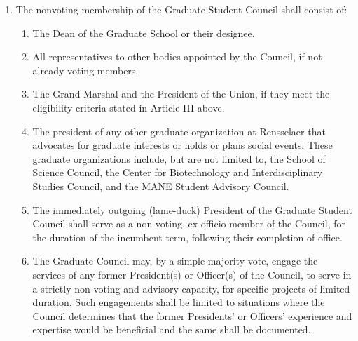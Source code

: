 \begin{enumerate}
\begin{enumerate}
  \end{enumerate}
\item The nonvoting membership of the Graduate Student Council shall consist of:
  \begin{enumerate}
  \item The Dean of the Graduate School or their designee.
  \item All representatives to other bodies appointed by the Council, if not already voting members.
  \item The Grand Marshal and the President of the Union, if they meet the eligibility criteria stated in Article III above.
  \item The president of any other graduate organization at Rensselaer that advocates for graduate interests or holds or plans social events. These graduate organizations include, but are not limited to, the School of Science Council, the Center for Biotechnology and Interdisciplinary Studies Council, and the MANE Student Advisory Council.
  \item The immediately outgoing (lame-duck) President of the Graduate Student Council shall serve as a non-voting, ex-officio member of the Council, for the duration of the incumbent term, following their completion of office.
  \item The Graduate Council may, by a simple majority vote, engage the services of any former President(s) or Officer(s) of the Council, to serve in a strictly non-voting and advisory capacity, for specific projects of limited duration. Such engagements shall be limited to situations where the Council determines that the former Presidents' or Officers' experience and expertise would be beneficial and the same shall be documented.

  \end{enumerate}
\end{enumerate}


